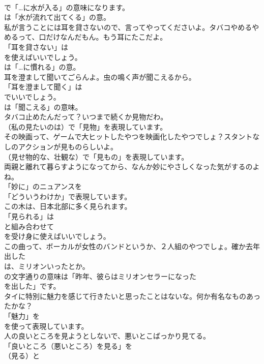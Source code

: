 \documentclass[8pt]{extreport}
\begin{document}
\begin{CJK}{UTF8}{min}
\\	で「…に水が入る」の意味になります。
\\	は「水が流れて出てくる」の意。	
\\	私が言うことには耳を貸さないので、言ってやってくださいよ。タバコやめるやめるって、口だけなんだもん。もう耳にたこだよ。 
\\	「耳を貸さない」は
\\	を使えばいいでしょう。
\\	は「…に慣れる」の意。	
\\	耳を澄まして聞いてごらんよ。虫の鳴く声が聞こえるから。 
\\	「耳を澄まして聞く」は
\\	でいいでしょう。
\\	は「聞こえる」の意味。	
\\	タバコ止めたんだって？いつまで続くか見物だわ。 
\\	（私の見たいのは）で「見物」を表現しています。	
\\	その映画って、ゲームで大ヒットしたやつを映画化したやつでしょ？スタントなしのアクションが見ものらしいよ。 
\\	（見せ物的な、壮観な）で「見もの」を表現しています。	
\\	両親と離れて暮らすようになってから、なんか妙にやさしくなった気がするのよね。 
\\	「妙に」のニュアンスを
\\	「どういうわけか」で表現しています。	
\\	この木は、日本北部に多く見られます。 
\\	「見られる」は
\\	と組み合わせて
\\	を受け身に使えばいいでしょう。	
\\	この曲って、ボーカルが女性のバンドというか、２人組のやつでしょ。確か去年出した
\\	は、ミリオンいったとか。 
\\	の文字通りの意味は「昨年、彼らはミリオンセラーになった
\\	を出した」です。	
\\	タイに特別に魅力を感じて行きたいと思ったことはないな。何か有名なものあったかな？ 
\\	「魅力」を
\\	を使って表現しています。	
\\	人の良いところを見ようとしないで、悪いとこばっかり見てる。 
\\	「良いところ（悪いところ）を見る」を 
\\	（見る）と 

\end{CJK}
\end{document}
